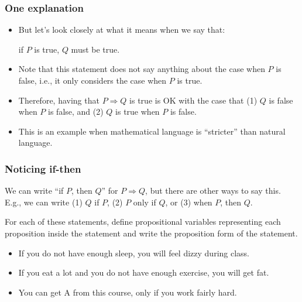 \documentclass{beamer}
\begin{document}
  
\begin{frame}\frametitle{One explanation}
  \begin{itemize}
  \item
    But let's look closely at what it means when we say that:

    \begin{tcolorbox}
      if $P$ is true, $Q$ must be true.
    \end{tcolorbox}

  \item
    Note that this statement does not say anything about the case when
    $P$ is false, i.e., it only considers the case when $P$ is true.
    \pause
    
  \item
    Therefore, having that $P\Rightarrow Q$ is true is OK with the
    case that (1) $Q$ is false when $P$ is false, and (2) $Q$ is true
    when $P$ is false.
    \pause
    
  \item
    This is an example when mathematical language is ``stricter'' than
    natural language.
  \end{itemize}
\end{frame}

\begin{frame}\frametitle{Noticing if-then}
  We can write ``if $P$, then $Q$'' for $P\Rightarrow Q$, but there
  are other ways to say this. E.g., we can write (1) $Q$ if $P$, (2) $P$
  only if $Q$, or (3) when $P$, then $Q$.

  \pause

  \begin{tcolorbox}[title=Quick check 3]
    For each of these statements, define
    propositional variables representing each proposition inside the
    statement and write the proposition form of the statement.
    \begin{itemize}
    \item If you do not have enough sleep, you will feel dizzy during class.
    \item If you eat a lot and you do not have enough exercise, you will
      get fat.
    \item You can get A from this course, only if you work fairly hard.
    \end{itemize}
  \end{tcolorbox}
  
\end{frame}
\end{document}
